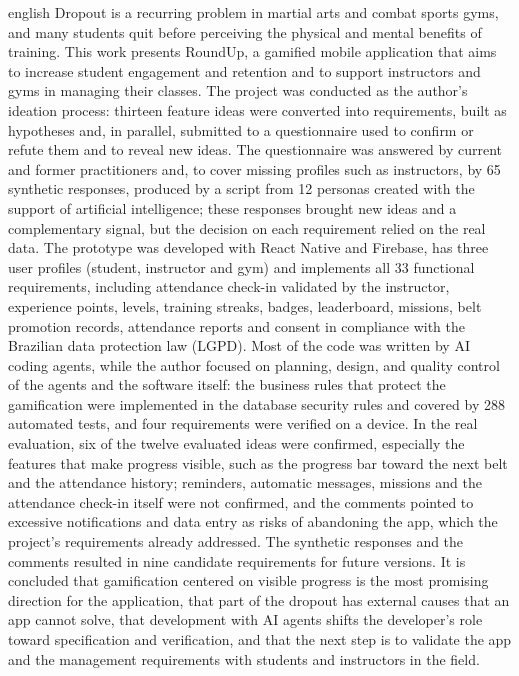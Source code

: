 \begin{resumo}[Abstract]
\begin{otherlanguage*}{english}
\SingleSpacing
\noindent Dropout is a recurring problem in martial arts and combat sports
gyms, and many students quit before perceiving the physical and mental
benefits of training. This work presents RoundUp, a gamified mobile
application that aims to increase student engagement and retention and to
support instructors and gyms in managing their classes. The project was
conducted as the author's ideation process: thirteen feature ideas were
converted into requirements, built as hypotheses and, in parallel,
submitted to a questionnaire used to confirm or refute them and to reveal
new ideas. The questionnaire was answered by current and former
practitioners and, to cover missing profiles such as instructors, by 65
synthetic responses, produced by a script from 12 personas created with
the support of artificial intelligence; these responses brought new ideas
and a complementary signal, but the decision on each requirement relied on
the real data. The prototype was developed with React Native and
Firebase, has three user profiles (student, instructor and gym) and
implements all 33 functional requirements, including attendance check-in
validated by the instructor, experience points, levels, training streaks,
badges, leaderboard, missions, belt promotion records, attendance reports
and consent in compliance with the Brazilian data protection law (LGPD).
Most of the code was written by AI coding agents, while the author
focused on planning, design, and quality control of the agents and the software itself: the business rules that
protect the gamification were implemented in the database security rules
and covered by 288 automated tests, and four requirements were verified on
a device. In the real evaluation, six of the twelve evaluated ideas were
confirmed, especially the features that make progress visible, such as the
progress bar toward the next belt and the attendance history; reminders,
automatic messages, missions and the attendance check-in itself were not
confirmed, and the comments pointed to excessive notifications and data
entry as risks of abandoning the app, which the project's requirements
already addressed. The synthetic responses and the comments resulted in
nine candidate requirements for future versions. It is concluded that
gamification centered on visible progress is the most promising direction
for the application, that part of the dropout has external causes that an
app cannot solve, that development with AI agents shifts the developer's
role toward specification and verification, and that the next step is to
validate the app and the management requirements with students and
instructors in the field.


\end{otherlanguage*}
\end{resumo}
